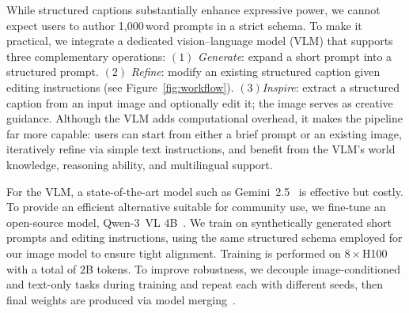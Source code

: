 While structured captions substantially enhance expressive power, we cannot expect users to author 1{,}000\,word prompts in a strict schema. To make it practical, we integrate a dedicated vision–language model (VLM) that supports three complementary operations: $(1)$ \emph{Generate}: expand a short prompt into a structured prompt. $(2)$ \emph{Refine}: modify an existing structured caption given editing instructions (see Figure~\ref{fig:workflow}). $(3)$\emph{Inspire}: extract a structured caption from an input image and optionally edit it; the image serves as creative guidance. Although the VLM adds computational overhead, it makes the pipeline far more capable: users can start from either a brief prompt or an existing image, iteratively refine via simple text instructions, and benefit from the VLM’s world knowledge, reasoning ability, and multilingual support.


For the VLM, a state-of-the-art model such as Gemini~2.5~\cite{comanici2025gemini} is effective but costly. To provide an efficient alternative suitable for community use, we fine-tune an open-source model, \mbox{Qwen-3~VL} 4B~\cite{qwen2.5-vl}. We train on synthetically generated short prompts and editing instructions, using the same structured schema employed for our image model to ensure tight alignment. Training is performed on $8\times$H100 with a total of $2$B tokens. To improve robustness, we decouple image-conditioned and text-only tasks during training and repeat each with different seeds, then final weights are produced via model merging~\cite{yang2024model}. 










